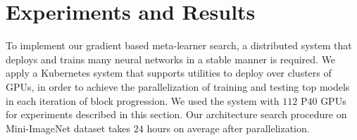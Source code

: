 \documentclass{article}
\begin{document}
%
\section{Experiments and Results}
To implement our gradient based meta-learner search, 
a distributed system that deploys and trains many neural networks
in a stable manner is required. We apply a Kubernetes system \cite{Kubernetes} that supports utilities to deploy over clusters of GPUs, in order to achieve the parallelization of training and testing top models in each iteration of block progression. 
We used the system with $112$ P$40$ GPUs for experiments described in this section. 
Our architecture search procedure on Mini-ImageNet dataset takes $24$ hours on average after parallelization.
\end{document}
